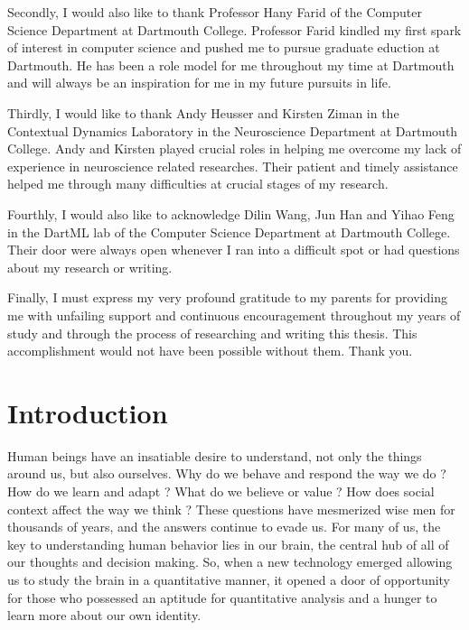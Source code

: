 \documentclass[11pt]{article}
\begin{document}
Secondly, I would also like to thank Professor Hany Farid of the Computer Science Department at Dartmouth College. Professor Farid kindled my first spark of interest in computer science and pushed me to pursue graduate eduction at Dartmouth. He has been a role model for me throughout my time at Dartmouth and will always be an inspiration for me in my future pursuits in life.

Thirdly, I would like to thank Andy Heusser and Kirsten Ziman in the Contextual Dynamics Laboratory in the Neuroscience Department at Dartmouth College. Andy and Kirsten played crucial roles in helping me overcome my lack of experience in neuroscience related researches. Their patient and timely assistance helped me through many difficulties at crucial stages of my research.

Fourthly, I would also like to acknowledge Dilin Wang, Jun Han and Yihao Feng in the DartML lab of the Computer Science Department at Dartmouth College. Their door were always open whenever I ran into a difficult spot or had questions about my research or writing.

Finally, I must express my very profound gratitude to my parents for providing me with unfailing support and continuous encouragement throughout my years of study and through the process of researching and writing this thesis. This accomplishment would not have been possible without them. Thank you.

\newpage
\tableofcontents
\newpage
{}

\section{Introduction}
Human beings have an insatiable desire to understand, not only the things around us, but also ourselves. Why do we behave and respond the way we do \citep{hasson2012}? How do we learn and adapt \citep{hasson2004}\citep{hasson2005}? What do we believe or value \citep{Greene01}? How does social context affect the way we think \citep{Matthew2015}? These questions have mesmerized wise men for thousands of years, and the answers continue to evade us. For many of us, the key to understanding human behavior lies in our brain, the central hub of all of our thoughts and decision making. So, when a new technology emerged allowing us to study the brain in a quantitative manner, it opened a door of opportunity for those who possessed an aptitude for quantitative analysis and a hunger to learn more about our own identity.
\end{document}
